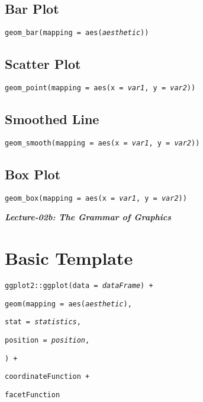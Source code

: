 \documentclass{tufte-handout}
\begin{document}
\vspace{3mm}
\subsection{Bar Plot}
{\color{red}\texttt{geom\_bar}}\texttt{(mapping = aes(\textit{aesthetic}))}

\vspace{3mm}
\subsection{Scatter Plot}
{\color{red}\texttt{geom\_point}}\texttt{(mapping = aes(x = \textit{var1}, y = \textit{var2}))}

\vspace{3mm}
\subsection{Smoothed Line}
{\color{red}\texttt{geom\_smooth}}\texttt{(mapping = aes(x = \textit{var1}, y = \textit{var2}))}

\vspace{3mm}
\subsection{Box Plot}
{\color{red}\texttt{geom\_box}}\texttt{(mapping = aes(x = \textit{var1}, y = \textit{var2}))}

\newpage
\begin{center}
{\Large\textit{\textbf{Lecture-02b: The Grammar of Graphics}}}
\end{center}

\section{Basic Template}
\texttt{ggplot2::}{\color{red}\texttt{ggplot}}\texttt{(data = \textit{dataFrame}) +}
\par \noindent \hspace{5mm} {\color{red}\texttt{geom}}\texttt{(mapping = 
aes(\textit{aesthetic}),}
\par \noindent \hspace{8mm} \texttt{stat = \textit{statistics},}
\par \noindent \hspace{8mm} \texttt{position = \textit{position},}
\par \noindent \hspace{5mm} \texttt{) +}
\par \noindent \hspace{5mm} {\color{red}\texttt{coordinateFunction}}\texttt{ +}
\par \noindent \hspace{5mm} {\color{red}\texttt{facetFunction}}
\end{document}
